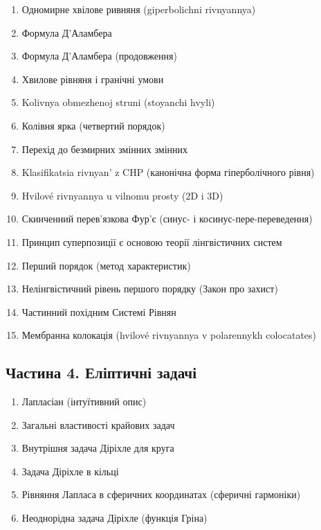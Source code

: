 \documentclass[
  ukrainian,
]{article}
\providecommand{\tightlist}{%
  \setlength{\itemsep}{0pt}\setlength{\parskip}{0pt}}
\begin{document}
\begin{enumerate}
\def\labelenumi{\arabic{enumi}.}
\setcounter{enumi}{15}
\tightlist
\item
  Одномирне хвілове ривняня (giperbolichni rivnyannya)
\item
  Формула Д'Аламбера
\item
  Формула Д'Аламбера (продовження)
\item
  Хвилове рівняня і гранічні умови
\item
  Kolivnya obmezhenoj struni (stoyanchi hvyli)
\item
  Колівня ярка (четвертий порядок)
\item
  Перехід до безмирних змінних змінних
\item
  Klasifikatsia rivnyan' z CHP (канонічна форма гіперболічного рівня)
\item
  Hvilové rivnyannya u vilnomu prosty (2D i 3D)
\item
  Скинченний перев'язкова Фур'є (синус- і косинус-пере-переведення)
\item
  Принцип суперпозиції є основою теорії лінгвістичних систем
\item
  Перший порядок (метод характеристик)
\item
  Нелінгвістичний рівень першого порядку (Закон про захист)
\item
  Частинний похідним Системі Рівнян
\item
  Мембранна колокація (hvilové rivnyannya v polarennykh colocatates)
\end{enumerate}

\subsection{Частина 4. Еліптичні
задачі}\label{ux447ux430ux441ux442ux438ux43dux430-4.-ux435ux43bux456ux43fux442ux438ux447ux43dux456-ux437ux430ux434ux430ux447ux456}

\begin{enumerate}
\def\labelenumi{\arabic{enumi}.}
\setcounter{enumi}{30}
\tightlist
\item
  Лапласіан (інтуїтивний опис)
\item
  Загальні властивості крайових задач
\item
  Внутрішня задача Діріхле для круга
\item
  Задача Діріхле в кільці
\item
  Рівняння Лапласа в сферичних координатах (сферичні гармоніки)
\item
  Неоднорідна задача Діріхле (функція Гріна)
\end{enumerate}
\end{document}
